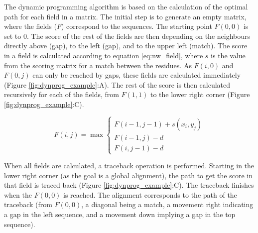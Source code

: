 \documentclass[a4paper, twoside, 12pt, openright]{report}
\begin{document}
The dynamic programming algorithm is based on the calculation of the optimal path for each field in a matrix. The initial step is to generate an empty matrix, where the fields ($F$) correspond to the sequences. The starting point $F(0,0)$ is set to 0. The score of the rest of the fields are then depending on the neighbours directly above (gap), to the left (gap), and to the upper left (match). The score in a field is calculated according to equation \ref{eq:nw_field}, where $s$ is the value from the scoring matrix for a match between the residues. As $F(i,0)$ and $F(0,j)$ can only be reached by gaps, these fields are calculated immediately (Figure \ref{fig:dynprog_example}:A). The rest of the score is then calculated recursively for each of the fields, from $F(1,1)$ to the lower right corner (Figure \ref{fig:dynprog_example}:C).

\begin{equation}
     F(i,j) = \max 
    \begin{cases}
      F(i-1,j-1) + s(x_i, y_j)\\
      F(i-1,j) - d\\
       F(i,j-1) - d
    \end{cases}
    \label{eq:nw_field}
\end{equation}

When all fields are calculated, a traceback operation is performed. Starting in the lower right corner (as the goal is a global alignment), the path to get the score in that field is traced back (Figure \ref{fig:dynprog_example}:C). The traceback finishes when the $F(0,0)$ is reached. The alignment corresponds to the path of the traceback (from $F(0,0)$, a diagonal being a match, a movement right indicating a gap in the left sequence, and a movement down implying a gap in the top sequence).
\end{document}
